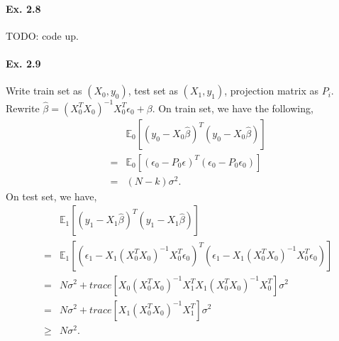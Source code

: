 \paragraph*{Ex. 2.8}
TODO: code up.

\paragraph*{Ex. 2.9}
Write train set as $(X_0, y_0)$, test set as $(X_1, y_1)$, projection matrix as $P_i$.
Rewrite $\hat{\beta} = (X_0^T X_0)^{-1}X_0^{T}\epsilon_0 + \beta.$ On train set, we have the following,
\begin{eqnarray*}
	&&\mathbb{E}_{0}\left[(y_0 - X_0\hat{\beta})^T(y_0 - X_0\hat{\beta})\right]\\
	&=&\mathbb{E}_{0}\left[(\epsilon_0 - P_0\epsilon)^T(\epsilon_0 - P_0\epsilon_0)\right]\\
	&=&(N - k)\sigma^2.
\end{eqnarray*}
On test set, we have,
\begin{eqnarray*}
	&&\mathbb{E}_{1}\left[(y_1 - X_1\hat{\beta})^T(y_1 - X_1\hat{\beta})\right]\\
	&=&\mathbb{E}_{1}\left[(\epsilon_1 - X_1(X_0^TX_0)^{-1}X_0^T\epsilon_0)^T(\epsilon_1 - X_1(X_0^TX_0)^{-1}X_0^T\epsilon_0)\right]\\
	&=&N\sigma^2 + trace\left[X_0(X_0^TX_0)^{-1}X_1^TX_1(X_0^TX_0)^{-1}X_0^T\right]\sigma^2\\
	&=&N\sigma^2 + trace\left[X_1(X_0^TX_0)^{-1}X_1^T\right]\sigma^2\\
	&\geq& N\sigma^2.
\end{eqnarray*}
